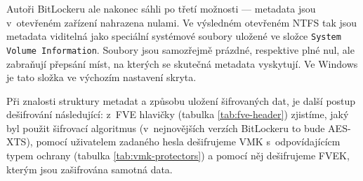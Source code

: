 Autoři BitLockeru ale nakonec sáhli po třetí možnosti --- metadata jsou v~otevřeném zařízení nahrazena nulami. Ve výsledném otevřeném NTFS tak jsou metadata viditelná jako speciální systémové soubory uložené ve složce \texttt{System Volume Information}. Sou\-bo\-ry jsou samozřejmě prázdné, respektive plné nul, ale zabraňují přepsání míst, na kterých se skutečná metadata vyskytují. Ve Windows je tato složka ve výchozím nastavení skryta.\cite{Russinovich2012}


Při znalosti struktury metadat a způsobu uložení šifrovaných dat, je další postup dešifrování následující: z~FVE hlavičky (tabulka \ref{tab:fve-header}) zjistíme, jaký byl použit šifrovací algoritmus (v~nejnovějších verzích BitLockeru to bude AES-XTS), pomocí uživatelem zadaného hesla dešifrujeme VMK s~odpovídajícícm typem ochrany (tabulka \ref{tab:vmk-protectors}) a pomocí něj dešifrujeme FVEK, kterým jsou zašifrována samotná data.

